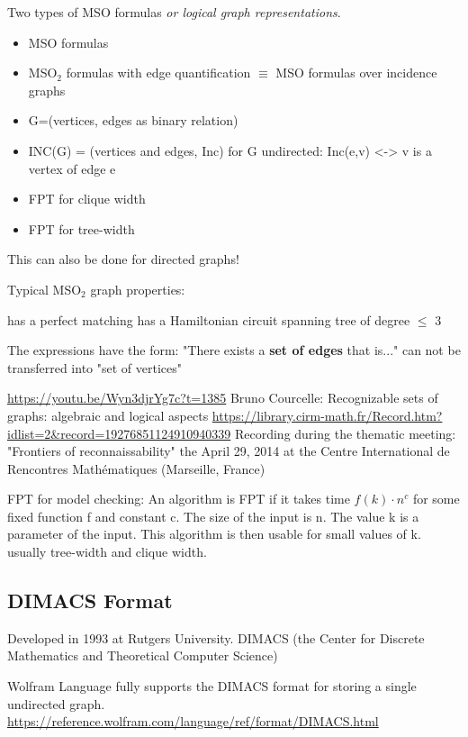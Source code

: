\documentclass[a4paper, 12pt]{scrartcl}
\begin{document}
Two types of MSO formulas \textit{or logical graph representations}.
\begin{itemize}
	\item MSO formulas
	\item MSO$_{2}$ formulas with edge quantification $\equiv$ MSO formulas over incidence graphs
\end{itemize}
\begin{itemize}
	\item G=(vertices, edges as binary relation)
	\item INC(G) = (vertices and edges, Inc)
		for G undirected: Inc(e,v) <-> v is a vertex of edge e
\end{itemize}
\begin{itemize}
	\item FPT for clique width
	\item FPT for tree-width
\end{itemize}
This can also be done for directed graphs!

Typical MSO$_{2}$ graph properties:

has a perfect matching
has a Hamiltonian circuit
spanning tree of degree $\le$ 3

The expressions have the form: "There exists a \textbf{set of edges} that is..." can not be transferred into "set of vertices"

\url{https://youtu.be/Wyn3djrYg7c?t=1385} Bruno Courcelle: Recognizable sets of graphs: algebraic and logical aspects 
\url{https://library.cirm-math.fr/Record.htm?idlist=2&record=19276851124910940339}
Recording during the thematic meeting: "Frontiers of reconnaissability" the April 29, 2014 at the Centre International de Rencontres Mathématiques (Marseille, France)

FPT for model checking:
An algorithm is FPT if it takes time $f(k)\cdot n^{c}$ for some fixed function f and constant c. The size of the input is n. 
The value k is a parameter of the input. 
This algorithm is then usable for small values of k. usually tree-width and clique width.


\subsection{DIMACS Format}
Developed in 1993 at Rutgers University.
DIMACS (the Center for Discrete Mathematics and Theoretical Computer Science)

Wolfram Language fully supports the DIMACS format for storing a single undirected graph.
\url{https://reference.wolfram.com/language/ref/format/DIMACS.html}
\end{document}
